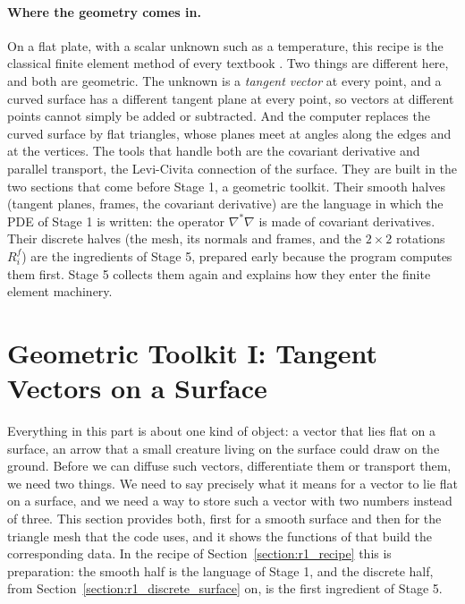 \paragraph{Where the geometry comes in.} On a flat plate, with a scalar unknown such as a temperature, this recipe is the classical finite element method of every textbook \cite{Sayas2015, Langtangen2014}. Two things are different here, and both are geometric. The unknown is a \emph{tangent vector} at every point, and a curved surface has a different tangent plane at every point, so vectors at different points cannot simply be added or subtracted. And the computer replaces the curved surface by flat triangles, whose planes meet at angles along the edges and at the vertices. The tools that handle both are the covariant derivative and parallel transport, the Levi-Civita connection of the surface. They are built in the two sections that come before Stage 1, a geometric toolkit. Their smooth halves (tangent planes, frames, the covariant derivative) are the language in which the PDE of Stage 1 is written: the operator $\nabla^*\nabla$ is made of covariant derivatives. Their discrete halves (the mesh, its normals and frames, and the $2\times 2$ rotations $R_i^f$) are the ingredients of Stage 5, prepared early because the program computes them first. Stage 5 collects them again and explains how they enter the finite element machinery.

\section{Geometric Toolkit I: Tangent Vectors on a Surface}
\label{section:geometry}

Everything in this part is about one kind of object: a vector that lies flat on a surface, an arrow that a small creature living on the surface could draw on the ground. Before we can diffuse such vectors, differentiate them or transport them, we need two things. We need to say precisely what it means for a vector to lie flat on a surface, and we need a way to store such a vector with two numbers instead of three. This section provides both, first for a smooth surface and then for the triangle mesh that the code uses, and it shows the functions of  that build the corresponding data. In the recipe of Section~\ref{section:r1_recipe} this is preparation: the smooth half is the language of Stage 1, and the discrete half, from Section~\ref{section:r1_discrete_surface} on, is the first ingredient of Stage 5.

